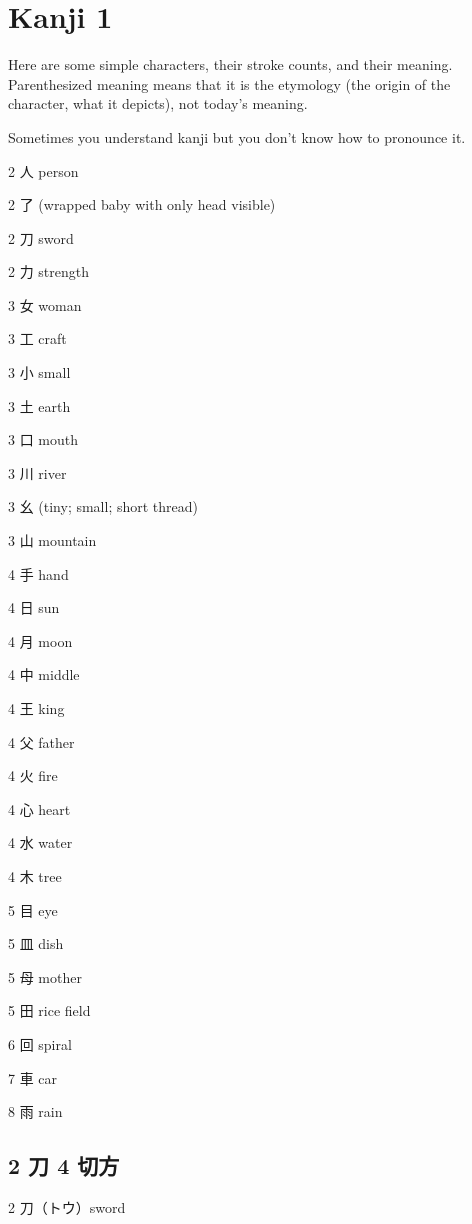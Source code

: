 \chapter{Kanji 1}

Here are some simple characters, their stroke counts, and their meaning.
Parenthesized meaning means that it is the etymology
(the origin of the character, what it depicts),
not today's meaning.

Sometimes you understand kanji but you don't know how to pronounce it.

2 人 person\par
2 了 (wrapped baby with only head visible)\par
2 刀 sword\par
2 力 strength\par
3 女 woman\par
3 工 craft\par
3 小 small\par
3 土 earth\par
3 口 mouth\par
3 川 river\par
3 幺 (tiny; small; short thread)\par
3 山 mountain\par
4 手 hand\par
4 日 sun\par
4 月 moon\par
4 中 middle\par
4 王 king\par
4 父 father\par
4 火 fire\par
4 心 heart\par
4 水 water\par
4 木 tree\par
5 目 eye\par
5 皿 dish\par
5 母 mother\par
5 田 rice field\par
6 回 spiral\par
7 車 car\par
8 雨 rain\par



\section{2 刀 4 切方}

2 刀（トウ）sword

